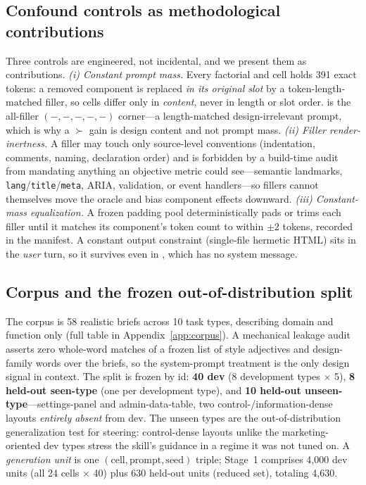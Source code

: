 \subsection{Confound controls as methodological contributions}
Three controls are engineered, not incidental, and we present them as contributions.
\emph{(i) Constant prompt mass.} Every factorial and \LOO{} cell holds 391 exact tokens: a
removed component is replaced \emph{in its original slot} by a token-length-matched filler, so
cells differ only in \emph{content}, never in length or slot order. \NEUTRAL{} is the all-filler
$(-,-,-,-,-)$ corner---a length-matched design-irrelevant prompt, which is why a \FULL$\succ$\NEUTRAL{}
gain is design content and not prompt mass. \emph{(ii) Filler render-inertness.} A filler may
touch only source-level conventions (indentation, comments, naming, declaration order) and is
forbidden by a build-time audit from mandating anything an objective metric could see---semantic
landmarks, \texttt{lang}/\texttt{title}/\texttt{meta}, ARIA, validation, or event handlers---so
fillers cannot themselves move the oracle and bias component effects downward. \emph{(iii)
Constant-mass equalization.} A frozen padding pool deterministically pads or trims each filler
until it matches its component's token count to within $\pm2$ tokens, recorded in the manifest.
A constant output constraint (single-file hermetic HTML) sits in the \emph{user} turn, so it
survives even in \NOSYS, which has no system message.

\subsection{Corpus and the frozen out-of-distribution split}
The corpus is 58 realistic briefs across 10 task types, describing domain and function only
(full table in Appendix~\ref{app:corpus}). A mechanical leakage audit asserts zero whole-word
matches of a frozen list of style adjectives and design-family words over the briefs, so the
system-prompt treatment is the only design signal in context. The split is frozen by id:
\textbf{40 dev} (8 development types $\times$ 5), \textbf{8 held-out seen-type} (one per
development type), and \textbf{10 held-out unseen-type}---settings-panel and admin-data-table,
two control-/information-dense layouts \emph{entirely absent} from dev. The unseen types are the
out-of-distribution generalization test for steering: control-dense layouts unlike the
marketing-oriented dev types stress the skill's guidance in a regime it was not tuned on. A
\emph{generation unit} is one $(\text{cell},\text{prompt},\text{seed})$ triple; Stage~1
comprises 4{,}000 dev units (all 24 cells $\times$ 40) plus 630 held-out units (reduced set),
totaling 4{,}630.

